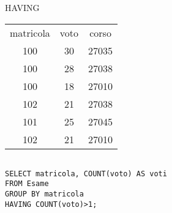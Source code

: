 \begin{frame}{HAVING}
\begin{table}[h]
\centering
\begin{minipage}{.45\textwidth}
\centering
\begin{tabular}{|c|c|c|}
\hline
\rowcolor{cyan!30} \multicolumn{3}{|c|}{Esame} \\
\hline
\rowcolor{cyan!30} matricola  & voto & corso \\
\hline
100  & 30 & 27035 \\
100  & 28 & 27038 \\
100  & 18 & 27010 \\
102  & 21 & 27038 \\
101  & 25 & 27045 \\
102 & 21 & 27010 \\
\hline
\end{tabular}
\end{minipage}%
\begin{minipage}{.45\textwidth}
\centering
\begin{tabular}{|c|c|c|}
\hline

\hline
\end{tabular}
\end{minipage}
\end{table}
\vspace{2em}
\texttt{SELECT matricola, COUNT(voto) AS voti\\FROM Esame\\GROUP BY matricola\\HAVING COUNT(voto)>1;}
\end{frame}
